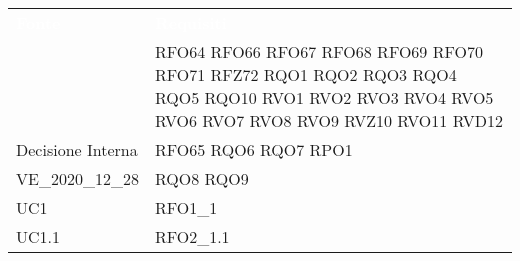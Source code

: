 \renewcommand{\arraystretch}{1.5}


\begin{longtable}{C{6cm} C{6cm}} 
	
	\textcolor{white}{\textbf{Fonte}}&
	\textcolor{white}{\textbf{Requisiti}}\\	

	 & RFO64 \newline RFO66 \newline RFO67 \newline RFO68 \newline RFO69 \newline RFO70 \newline RFO71 \newline RFZ72 \newline RQO1 \newline RQO2 \newline RQO3 \newline RQO4 \newline RQO5 \newline RQO10 \newline RVO1 \newline RVO2 \newline RVO3 \newline RVO4 \newline RVO5 \newline RVO6 \newline RVO7 \newline RVO8 \newline RVO9 \newline RVZ10 \newline RVO11 \newline RVD12 \\
	
	Decisione Interna & RFO65 \newline RQO6 \newline RQO7 \newline RPO1  \\
	
	VE\_2020\_12\_28 & RQO8 \newline RQO9  \\

	UC1 & RFO1\_1 \\

	UC1.1 & RFO2\_1.1 \\
	

\end{longtable}
